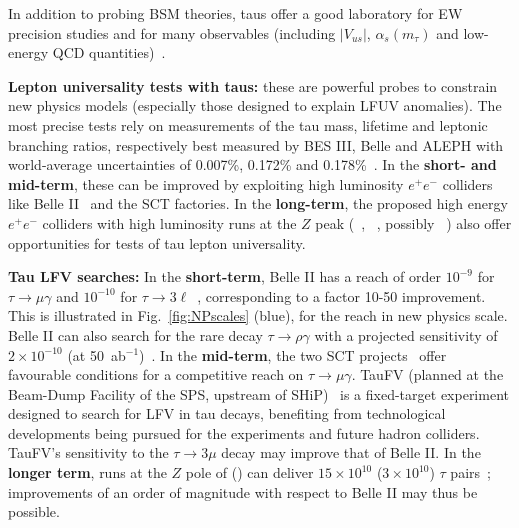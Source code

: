 In addition to probing BSM theories, taus offer a 
good laboratory for EW precision studies and for many observables (including $|V_{us}|$, $\alpha_s(m_\tau)$ and low-energy QCD quantities)~\cite{LusianiESPP19}.

\noindent
{\bf Lepton universality tests with taus:}
these are 
powerful probes to constrain new physics models (especially those 
designed to explain LFUV anomalies).
The most precise tests rely on measurements of the tau mass,
lifetime and leptonic branching ratios, respectively 
best measured by BES III, Belle and ALEPH 
with world-average uncertainties of 0.007\%, 0.172\% and 0.178\%~\cite{Tanabashi:2018oca}.
In the {\bf short- and mid-term}, these can be improved 
by exploiting high luminosity $e^+ e^-$ colliders
like Belle II~\cite{Abe:2010gxa,Kou:2018nap} and the SCT factories. In the {\bf long-term}, 
the proposed high energy $e^+ e^-$ colliders with high
luminosity runs at the $Z$ peak (\FCCee~\cite{Blondel:2019yqr}, 
\CEPC~\cite{CEPC_INPUT}, possibly \ILC~\cite{Baer:2013cma,Fujii:2017vwa}) also offer opportunities for tests of tau lepton universality. 

{\bf Tau LFV searches:} In the {\bf short-term}, 
Belle II has a reach of
order $10^{-9}$ for $\tau \to \mu \gamma$  and 
$10^{-10}$ for $\tau \to 3 \ell$~\cite{Kou:2018nap}, corresponding to a factor 10-50 improvement. This is illustrated in Fig.~\ref{fig:NPscales} (blue), for the reach in new physics scale. 
Belle II can also search for the rare decay $\tau \to \rho \gamma$ with a projected sensitivity of $2\times 10^{-10}$ (at 50~ab$^{-1}$)~\cite{Kou:2018nap}. 
In the {\bf mid-term},  
the two SCT projects~\cite{Bondar:2013cja,Novosibirsk_SCT_input,Luo:2018njj,Peng:2018} offer favourable conditions for a competitive reach on $\tau \to \mu \gamma$. 
TauFV (planned at the Beam-Dump Facility of the
SPS, upstream of SHiP)~\cite{TauFV_input}
is a fixed-target experiment designed to search for LFV in tau decays, 
benefiting from technological developments being
pursued for the \HLLHC experiments and future hadron colliders.
TauFV's sensitivity to the $\tau \to 3 \mu$ decay
may improve that of Belle II.
In the {\bf longer term}, runs at the $Z$ pole of \FCCee (\CEPC)
can deliver 
$15\times 10^{10}$ ($3 \times 10^{10}$) $\tau$ pairs~\cite{Blondel:2019yqr, CEPC_INPUT}; 
improvements of an
order of magnitude with respect to Belle II may thus be possible. 


